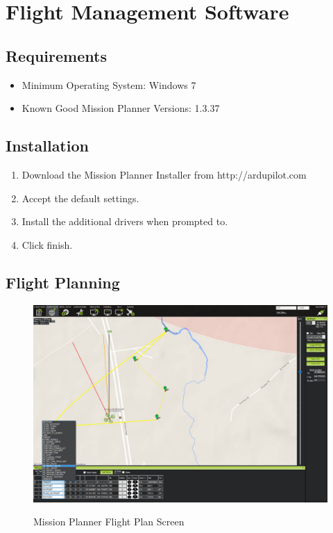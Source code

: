\documentclass{report}
\begin{document}
\chapter{Flight Management Software}
	\label{chap:FMS}
	\section{Requirements}
		\begin{itemize}
			\item Minimum Operating System: Windows 7
			\item Known Good Mission Planner Versions: 1.3.37
		\end{itemize}
	\section{Installation}
		\begin{enumerate}
			\item Download the Mission Planner Installer from http://ardupilot.com
			\item Accept the default settings.
			\item Install the additional drivers when prompted to.
			\item Click finish.
		\end{enumerate}
	\section{Flight Planning}
		\begin{figure}[ht]
			\centering
			\caption{Mission Planner Flight Plan Screen}
			\includegraphics[width=\textwidth]{mp_flight_plan_screen.jpg}
			\label{fig:mp_flight_plan}
		\end{figure}
\end{document}
